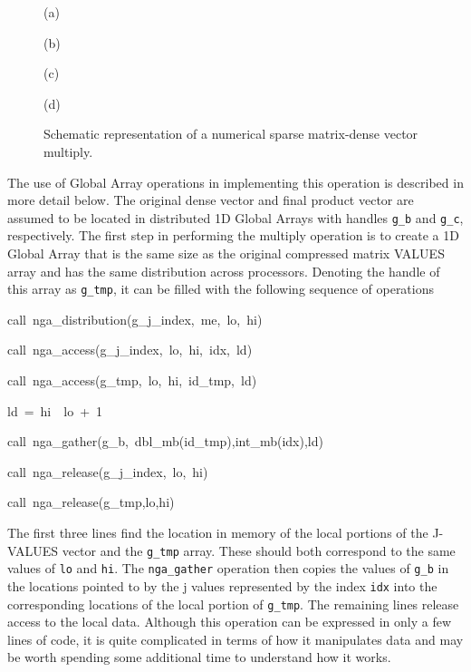 %
\begin{figure}
(a)


(b)


(c)


(d)


\caption{\label{cap:SparseMatrix}Schematic representation of a numerical sparse
matrix-dense vector multiply.}

\end{figure}


The use of Global Array operations in implementing this operation
is described in more detail below. The original dense vector and final
product vector are assumed to be located in distributed 1D Global
Arrays with handles \texttt{g\_b} and \texttt{g\_c}, respectively.
The first step in performing the multiply operation is to create a
1D Global Array that is the same size as the original compressed matrix
VALUES array and has the same distribution across processors. Denoting
the handle of this array as \texttt{g\_tmp}, it can be filled with
the following sequence of operations
\begin{lyxcode}
call~nga\_distribution(g\_j\_index,~me,~lo,~hi)~

call~nga\_access(g\_j\_index,~lo,~hi,~idx,~ld)~

call~nga\_access(g\_tmp,~lo,~hi,~id\_tmp,~ld)~

ld~=~hi~\textendash{}~lo~+~1~

call~nga\_gather(g\_b,~dbl\_mb(id\_tmp),int\_mb(idx),ld)~

call~nga\_release(g\_j\_index,~lo,~hi)~

call~nga\_release(g\_tmp,lo,hi)
\end{lyxcode}
The first three lines find the location in memory of the local portions
of the J-VALUES vector and the \texttt{g\_tmp} array. These should
both correspond to the same values of \texttt{lo} and \texttt{hi}.
The \texttt{nga\_gather} operation then copies the values of \texttt{g\_b}
in the locations pointed to by the j values represented by the index
\texttt{idx} into the corresponding locations of the local portion
of \texttt{g\_tmp}. The remaining lines release access to the local
data. Although this operation can be expressed in only a few lines
of code, it is quite complicated in terms of how it manipulates data
and may be worth spending some additional time to understand how it
works.

